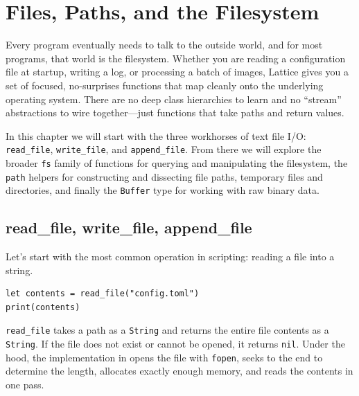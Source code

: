 \chapter{Files, Paths, and the Filesystem}\label{ch:filesystem}


Every program eventually needs to talk to the outside world, and for most
programs, that world is the filesystem. Whether you are reading a configuration
file at startup, writing a log, or processing a batch of images, Lattice gives
you a set of focused, no-surprises functions that map cleanly onto the
underlying operating system. There are no deep class hierarchies to learn and
no ``stream'' abstractions to wire together---just functions that take paths
and return values.

In this chapter we will start with the three workhorses of text file I/O:
\lstinline|read_file|, \lstinline|write_file|, and \lstinline|append_file|.
From there we will explore the broader \texttt{fs} family of functions for
querying and manipulating the filesystem, the \texttt{path} helpers for
constructing and dissecting file paths, temporary files and directories, and
finally the \lstinline|Buffer| type for working with raw binary data.

\section{read\_file, write\_file, append\_file}\label{sec:read-write-append}


Let's start with the most common operation in scripting: reading a file into a
string.

\begin{lstlisting}[language=Lattice, caption={Reading and printing a file}]
let contents = read_file("config.toml")
print(contents)
\end{lstlisting}

\lstinline|read_file| takes a path as a \lstinline|String| and returns the
entire file contents as a \lstinline|String|. If the file does not exist or
cannot be opened, it returns \lstinline|nil|. Under the hood, the
implementation in  opens the file with
\texttt{fopen}, seeks to the end to determine the length, allocates exactly
enough memory, and reads the contents in one pass.

